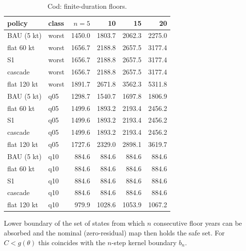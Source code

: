 \documentclass[11pt,a4paper]{article}
\begin{document}
\begin{table}[H]
\centering
\caption{Cod: finite-duration floors.}
\label{tab:si-cod-floors}
\small
\begin{tabular}{llrrrr}
\toprule
policy & class & $n=5$ & 10 & 15 & 20 \\
\midrule
BAU (5 kt) & worst & 1450.0 & 1803.7 & 2062.3 & 2275.0 \\
flat 60 kt & worst & 1656.7 & 2188.8 & 2657.5 & 3177.4 \\
S1 & worst & 1656.7 & 2188.8 & 2657.5 & 3177.4 \\
cascade & worst & 1656.7 & 2188.8 & 2657.5 & 3177.4 \\
flat 120 kt & worst & 1891.7 & 2671.8 & 3562.3 & 5311.8 \\
BAU (5 kt) & q05 & 1298.7 & 1540.7 & 1697.8 & 1806.9 \\
flat 60 kt & q05 & 1499.6 & 1893.2 & 2193.4 & 2456.2 \\
S1 & q05 & 1499.6 & 1893.2 & 2193.4 & 2456.2 \\
cascade & q05 & 1499.6 & 1893.2 & 2193.4 & 2456.2 \\
flat 120 kt & q05 & 1727.6 & 2329.0 & 2898.1 & 3619.7 \\
BAU (5 kt) & q10 & 884.6 & 884.6 & 884.6 & 884.6 \\
flat 60 kt & q10 & 884.6 & 884.6 & 884.6 & 884.6 \\
S1 & q10 & 884.6 & 884.6 & 884.6 & 884.6 \\
cascade & q10 & 884.6 & 884.6 & 884.6 & 884.6 \\
flat 120 kt & q10 & 979.9 & 1028.6 & 1053.9 & 1067.2 \\
\bottomrule
\end{tabular}
\par\smallskip\begin{minipage}{0.97\linewidth}\footnotesize Lower boundary of the set of states from which $n$ consecutive floor years can be absorbed and the nominal (zero-residual) map then holds the safe set. For $C<g(\theta)$ this coincides with the $n$-step kernel boundary $b_n$.\end{minipage}
\end{table}
\end{document}
